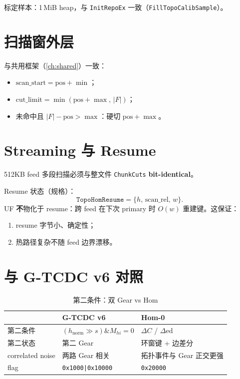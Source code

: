 标定样本：1\,MiB heap，与 \texttt{InitRepoEx} 一致（\texttt{FillTopoCalibSample}）。

\section{扫描窗外层}

与共用框架（\cref{ch:shared}）一致：
\begin{itemize}[nosep]
  \item $\mathrm{scan\_start}=\mathrm{pos}+\min$；
  \item $\mathrm{cut\_limit}=\min(\mathrm{pos}+\max,\,|F|)$；
  \item 未命中且 $|F|-\mathrm{pos}>\max$：硬切 $\mathrm{pos}+\max$。
\end{itemize}

\section{Streaming 与 Resume}

512KB feed 多段扫描必须与整文件 \texttt{ChunkCuts} \textbf{bit-identical}。

Resume 状态（规格）：
\begin{equation}
\texttt{TopoHomResume}=\{h,\,\mathrm{scan\_rel},\,w\}.
\end{equation}
UF \textbf{不}物化于 resume：跨 feed 在下次 primary 时 $O(w)$ 重建键。这保证：
\begin{enumerate}[nosep]
  \item resume 字节小、确定性；
  \item 热路径复杂不随 feed 边界漂移。
\end{enumerate}

\section{与 G-TCDC v6 对照}

\begin{table}[htbp]
\centering
\caption{第二条件：双 Gear vs Hom}
\label{tab:hom-vs-gt}
\begin{tabular}{@{}lll@{}}
\toprule
 & G-TCDC v6 & Hom-0 \\
\midrule
第二条件 & $(h_{\mathrm{norm}}\gg s)\mathbin{\&}M_{hi}=0$ & $\Delta C$ / $\Delta\mathrm{ed}$ \\
第二状态 & 第二 Gear & 环窗键 + 边差分 \\
correlated noise & 两路 Gear 相关 & 拓扑事件与 Gear 正交更强 \\
flag & \texttt{0x1000|0x10000} & \texttt{0x20000} \\
\bottomrule
\end{tabular}
\end{table}

